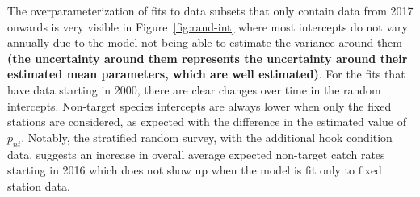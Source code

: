 \documentclass[12pt]{article}\usepackage[]{graphicx}\usepackage[]{color}
\begin{document}
The overparameterization of fits to data subsets that only contain data from 2017 onwards is very visible in Figure~\ref{fig:rand-int} where most intercepts do not vary annually due to the model not being able to estimate the variance around them \textbf{(the uncertainty around them represents the uncertainty around their estimated mean parameters, which are well estimated)}. For the fits that have data starting in 2000, there are clear changes over time in the random intercepts. Non-target species intercepts are always lower when only the fixed stations are considered, as expected with the difference in the estimated value of \(p_{nt}\). Notably, the stratified random survey, with the additional hook condition data, suggests an increase in overall average expected non-target catch rates starting in 2016 which does not show up when the model is fit only to fixed station data.
\end{document}

